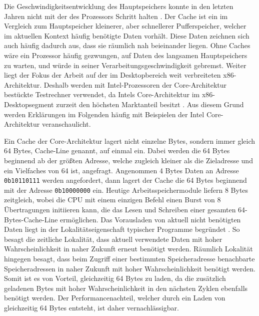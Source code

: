Die Geschwindigkeitsentwicklung des Hauptspeichers konnte in den letzten Jahren nicht mit der des Prozessors Schritt halten \cite{speedGapCPUandRAM}. Der Cache ist ein im Vergleich zum Hauptspeicher kleinerer, aber schnellerer Pufferspeicher, welcher im aktuellen Kontext häufig benötigte Daten vorhält. Diese Daten zeichnen sich auch häufig dadurch aus, dass sie räumlich nah beieinander liegen.
Ohne Caches wäre ein Prozessor häufig gezwungen, auf Daten des langsamen Hauptspeichers zu warten, und würde in seiner Verarbeitungsgeschwindigkeit gebremst. %
Weiter liegt der Fokus der Arbeit auf der im Desktopbereich weit verbreiteten x86-Architektur. Deshalb werden mit Intel-Prozessoren der Core-Architektur bestückte Testrechner verwendet, da Intels Core-Architektur im x86-Desktopsegment zurzeit den höchsten Marktanteil besitzt \cite{AMDIntelMarketShare}. Aus diesem Grund werden Erklärungen im Folgenden häufig mit Beispielen der Intel Core-Architektur veranschaulicht.

Ein Cache der Core-Architektur lagert nicht einzelne Bytes, sondern immer gleich 64 Bytes, Cache-Line genannt, auf einmal ein. Dabei werden die 64 Bytes beginnend ab der größten Adresse, welche zugleich kleiner als die Zieladresse und ein Vielfaches von 64 ist, angefragt.
Angenommen 4 Bytes Daten an Adresse \lstinline!0b10110111!
werden angefordert, dann lagert der Cache die 64 Bytes beginnend mit der Adresse \lstinline!0b10000000! ein.
Heutige Arbeitsspeichermodule liefern 8 Bytes zeitgleich, wobei die CPU mit einem einzigen Befehl einen Burst von 8 Übertragungen initiieren kann, die das Lesen und Schreiben einer gesamten 64-Bytes-Cache-Line ermöglichen.
Das Vorausladen von aktuell nicht benötigten Daten liegt in der Lokalitätseigenschaft typischer Programme begründet \cite{tanenbaumLocality}. So besagt die zeitliche Lokalität, dass aktuell verwendete Daten mit hoher Wahrscheinlichkeit in naher Zukunft erneut benötigt werden. Räumlich Lokalität hingegen besagt, dass beim Zugriff einer bestimmten Speicheradresse benachbarte Speicheradressen in naher Zukunft mit hoher Wahrscheinlichkeit benötigt werden.
Somit ist es von Vorteil, gleichzeitig 64 Bytes zu laden, da die zusätzlich geladenen Bytes mit hoher Wahrscheinlichkeit in den nächsten Zyklen ebenfalls benötigt werden. Der Performancenachteil, welcher durch ein Laden von gleichzeitig 64 Bytes entsteht, ist daher vernachlässigbar.

